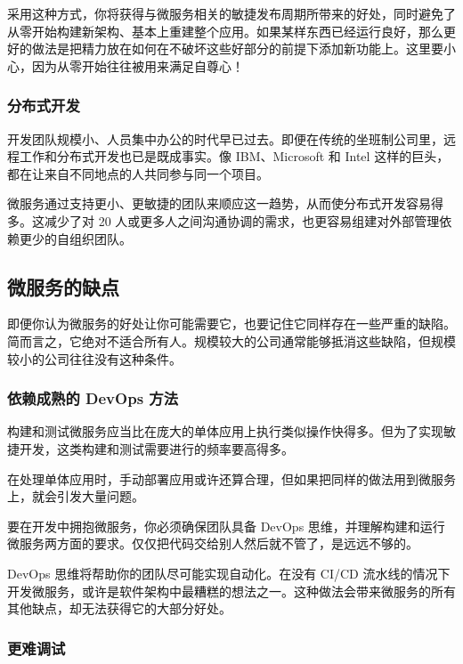 采用这种方式，你将获得与微服务相关的敏捷发布周期所带来的好处，同时避免了从零开始构建新架构、基本上重建整个应用。如果某样东西已经运行良好，那么更好的做法是把精力放在如何在不破坏这些好部分的前提下添加新功能上。这里要小心，因为从零开始往往被用来满足自尊心！

\subsubsection{分布式开发}

\label{idx:1400}
开发团队规模小、人员集中办公的时代早已过去。即便在传统的坐班制公司里，远程工作和分布式开发也已是既成事实。像 IBM、Microsoft 和 Intel 这样的巨头，都在让来自不同地点的人共同参与同一个项目。

\label{idx:1401}
\label{idx:1402}
微服务通过支持更小、更敏捷的团队来顺应这一趋势，从而使分布式开发容易得多。这减少了对 20 人或更多人之间沟通协调的需求，也更容易组建对外部管理依赖更少的自组织团队。

\subsection{微服务的缺点}

\label{idx:1403}
即便你认为微服务的好处让你可能需要它，也要记住它同样存在一些严重的缺陷。简而言之，它绝对不适合所有人。规模较大的公司通常能够抵消这些缺陷，但规模较小的公司往往没有这种条件。

\subsubsection{依赖成熟的 DevOps 方法}

\label{idx:1404}
构建和测试微服务应当比在庞大的单体应用上执行类似操作快得多。但为了实现敏捷开发，这类构建和测试需要进行的频率要高得多。

在处理单体应用时，手动部署应用或许还算合理，但如果把同样的做法用到微服务上，就会引发大量问题。

要在开发中拥抱微服务，你必须确保团队具备 DevOps 思维，并理解构建和运行微服务两方面的要求。仅仅把代码交给别人然后就不管了，是远远不够的。

DevOps 思维将帮助你的团队尽可能实现自动化。在没有 CI/CD 流水线的情况下开发微服务，或许是软件架构中最糟糕的想法之一。这种做法会带来微服务的所有其他缺点，却无法获得它的大部分好处。

\subsubsection{更难调试}

